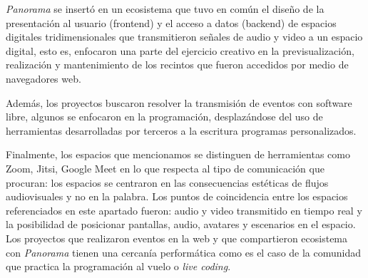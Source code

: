 


\textit{Panorama} se insertó en un ecosistema que tuvo en común el diseño de la presentación al usuario (frontend) y el acceso a datos (backend) de espacios digitales tridimensionales que transmitieron señales de audio y video a un espacio digital, esto es, enfocaron una parte del ejercicio creativo en la previsualización, realización y mantenimiento de los recintos que fueron accedidos por medio de navegadores web.

Además, los proyectos buscaron resolver la transmisión de eventos con software libre, algunos se enfocaron en la programación, desplazándose del uso de herramientas desarrolladas por terceros  a la escritura programas personalizados.

Finalmente, los espacios que mencionamos se distinguen de herramientas como Zoom, Jitsi, Google Meet en lo que respecta al tipo de comunicación que procuran: los espacios se centraron en las consecuencias estéticas de flujos audiovisuales y no en la palabra. Los puntos de coincidencia entre los espacios referenciados en este apartado fueron: audio y video transmitido en tiempo real y la posibilidad de posicionar pantallas, audio, avatares y escenarios en el espacio. Los proyectos que realizaron eventos en la web y que compartieron ecosistema con \textit{Panorama} tienen una cercanía performática como es el caso de la comunidad que practica la programación al vuelo o \textit{live coding}.





